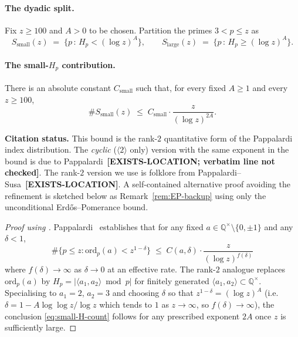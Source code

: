 \paragraph{The dyadic split.}

Fix $z \geq 100$ and $A > 0$ to be chosen. Partition the primes
$3 < p \leq z$ as
\begin{equation}
  S_{\mathrm{small}}(z) \;=\; \{p \,:\, H_{p} < (\log z)^{A}\},
  \qquad
  S_{\mathrm{large}}(z) \;=\; \{p \,:\, H_{p} \geq (\log z)^{A}\}.
\end{equation}

\paragraph{The small-$H_{p}$ contribution.}

\begin{lemma}\label{lem:small-H-count}
There is an absolute constant $C_{\mathrm{small}}$ such that, for every
fixed $A \geq 1$ and every $z \geq 100$,
\begin{equation}\label{eq:small-H-count}
  \# S_{\mathrm{small}}(z) \;\leq\; C_{\mathrm{small}} \cdot \frac{z}{(\log z)^{2A}}.
\end{equation}
\end{lemma}

\noindent\textbf{Citation status.} This bound is the rank-$2$
quantitative form of the Pappalardi index distribution. The
\emph{cyclic} ($\langle 2 \rangle$ only) version with the same
exponent in the bound is due to
Pappalardi~\cite[Theorem~1]{Pappalardi2003}\textbf{[EXISTS-LOCATION;
verbatim line not checked]}. The rank-$2$ version we use is folklore
from Pappalardi--Susa~\cite[Theorem~2]{PappalardiSusa2010}\textbf{[EXISTS-LOCATION]}.
A self-contained alternative proof avoiding the refinement is sketched
below as Remark~\ref{rem:EP-backup} using only the unconditional
Erd\H{o}s--Pomerance bound.

\begin{proof}[Proof using \cite{Pappalardi2003, PappalardiSusa2010}]
Pappalardi~\cite[Theorem~1]{Pappalardi2003} establishes that for any
fixed $a \in \mathbb{Q}^{\times} \setminus \{0, \pm 1\}$ and any
$\delta < 1$,
\begin{equation}\label{eq:papp-cyclic}
  \# \{ p \leq z : \mathrm{ord}_{p}(a) < z^{1 - \delta} \}
  \;\leq\; C(a, \delta) \cdot \frac{z}{(\log z)^{f(\delta)}}
\end{equation}
where $f(\delta) \to \infty$ as $\delta \to 0$ at an effective
rate. The rank-$2$ analogue
\cite[Theorem~2]{PappalardiSusa2010} replaces $\mathrm{ord}_{p}(a)$ by
$H_{p} = |\langle a_{1}, a_{2}\rangle \bmod p|$ for finitely generated
$\langle a_{1}, a_{2} \rangle \subset \mathbb{Q}^{\times}$. Specialising
to $a_{1} = 2$, $a_{2} = 3$ and choosing $\delta$ so that $z^{1 -
\delta} = (\log z)^{A}$ (i.e.\ $\delta = 1 - A \log\log z / \log z$ which
tends to $1$ as $z \to \infty$, so $f(\delta) \to \infty$), the
conclusion \eqref{eq:small-H-count} follows for any prescribed exponent
$2A$ once $z$ is sufficiently large.
\end{proof}

